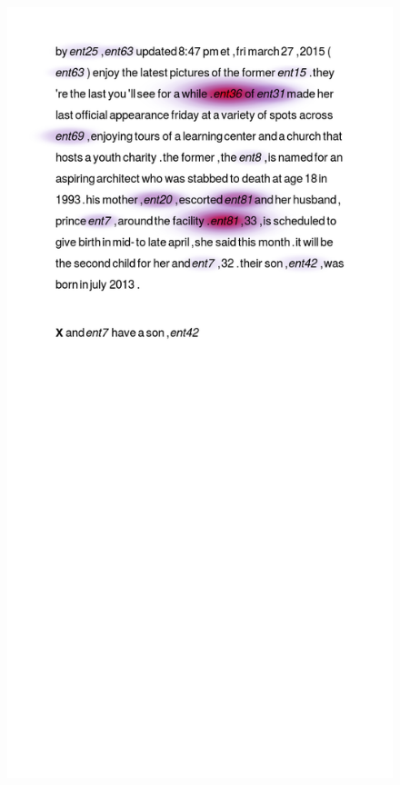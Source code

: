 \begin{figure}[t]
  \centering
  \includegraphics[scale=0.3,clip=true,trim=3cm 30cm 2cm 2cm]{figs/badexamples/10.png}%

\end{figure}
